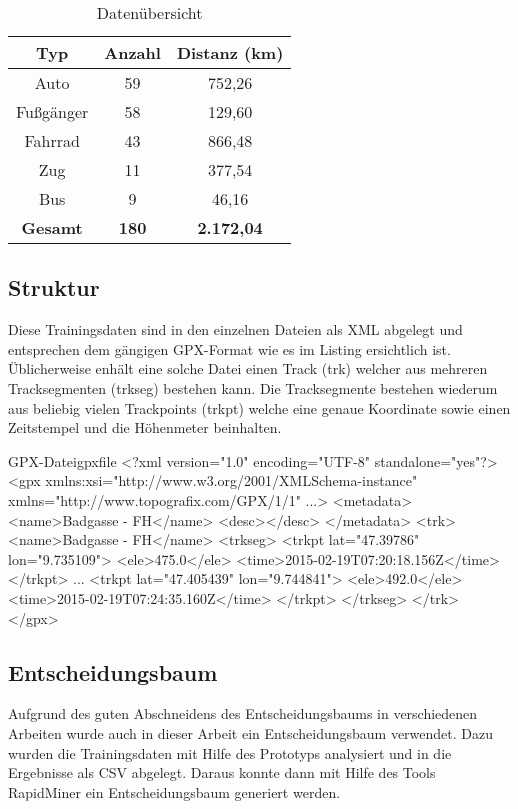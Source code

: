\begin{table}
\centering
\begin{tabular}{| c | c | c | }
\hline
\textbf{Typ} & \textbf{Anzahl} & \textbf{Distanz (km)}\\ 
\hline
Auto &	59 & 752,26\\
\hline
Fußgänger &	58 & 129,60\\
\hline
Fahrrad	& 43 & 866,48\\
\hline
Zug & 11 & 377,54\\
\hline
Bus	& 9 & 46,16\\
\hline
\textbf{Gesamt} & \textbf{180} & \textbf{2.172,04}\\
\hline
\end{tabular}
\caption{Datenübersicht}
\label{datenuebsicht}
\end{table}

\subsection{Struktur}
Diese Trainingsdaten sind in den einzelnen Dateien als XML abgelegt und entsprechen dem gängigen GPX-Format wie es im Listing  ersichtlich ist. Üblicherweise enhält eine solche Datei einen Track (trk) welcher aus mehreren Tracksegmenten (trkseg) bestehen kann. Die Tracksegmente bestehen wiederum aus beliebig vielen Trackpoints (trkpt) welche eine genaue Koordinate sowie einen Zeitstempel und die Höhenmeter beinhalten.

\begin{code}[xml]{GPX-Datei}{gpxfile}
<?xml version="1.0" encoding="UTF-8" standalone="yes"?>
<gpx xmlns:xsi="http://www.w3.org/2001/XMLSchema-instance" xmlns="http://www.topografix.com/GPX/1/1" ...>
    <metadata>
        <name>Badgasse - FH</name>
        <desc></desc>
    </metadata>
    <trk>
        <name>Badgasse - FH</name>
        <trkseg>
            <trkpt lat="47.39786" lon="9.735109">
                <ele>475.0</ele>
                <time>2015-02-19T07:20:18.156Z</time>
            </trkpt>
            ...
            <trkpt lat="47.405439" lon="9.744841">
                <ele>492.0</ele>
                <time>2015-02-19T07:24:35.160Z</time>
            </trkpt>
        </trkseg>
    </trk>
</gpx>
\end{code}

\subsection{Entscheidungsbaum}
Aufgrund des guten Abschneidens des Entscheidungsbaums in verschiedenen Arbeiten  \cite{stenneth_transportation_2011, reddy_using_2010, sebastian_nagel_moglichkeitsstudie_2011,zheng_learning_2008} wurde auch in dieser Arbeit ein Entscheidungsbaum verwendet. Dazu wurden die Trainingsdaten mit Hilfe des Prototyps analysiert und in die Ergebnisse als CSV abgelegt. Daraus konnte dann mit Hilfe des Tools RapidMiner ein Entscheidungsbaum generiert werden. 

